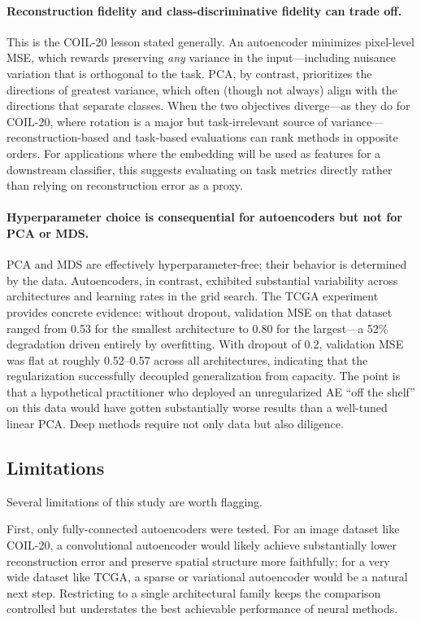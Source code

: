 \documentclass[11pt]{article}
\begin{document}
\paragraph{Reconstruction fidelity and class-discriminative fidelity can trade off.} This is the COIL-20 lesson stated generally. An autoencoder minimizes pixel-level MSE, which rewards preserving \emph{any} variance in the input---including nuisance variation that is orthogonal to the task. PCA, by contrast, prioritizes the directions of greatest variance, which often (though not always) align with the directions that separate classes. When the two objectives diverge---as they do for COIL-20, where rotation is a major but task-irrelevant source of variance---reconstruction-based and task-based evaluations can rank methods in opposite orders. For applications where the embedding will be used as features for a downstream classifier, this suggests evaluating on task metrics directly rather than relying on reconstruction error as a proxy.

\paragraph{Hyperparameter choice is consequential for autoencoders but not for PCA or MDS.} PCA and MDS are effectively hyperparameter-free; their behavior is determined by the data. Autoencoders, in contrast, exhibited substantial variability across architectures and learning rates in the grid search. The TCGA experiment provides concrete evidence: without dropout, validation MSE on that dataset ranged from 0.53 for the smallest architecture to 0.80 for the largest---a 52\% degradation driven entirely by overfitting. With dropout of 0.2, validation MSE was flat at roughly 0.52--0.57 across all architectures, indicating that the regularization successfully decoupled generalization from capacity. The point is that a hypothetical practitioner who deployed an unregularized AE ``off the shelf'' on this data would have gotten substantially worse results than a well-tuned linear PCA. Deep methods require not only data but also diligence.

\subsection{Limitations}

Several limitations of this study are worth flagging.

First, only fully-connected autoencoders were tested. For an image dataset like COIL-20, a convolutional autoencoder would likely achieve substantially lower reconstruction error and preserve spatial structure more faithfully; for a very wide dataset like TCGA, a sparse or variational autoencoder would be a natural next step. Restricting to a single architectural family keeps the comparison controlled but understates the best achievable performance of neural methods.
\end{document}
